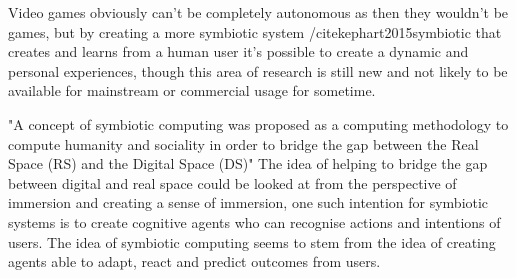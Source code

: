 \documentclass{scrartcl}
\begin{document}
Video games obviously can't be completely autonomous as then they wouldn't be games, but by creating a more symbiotic system /cite{kephart2015symbiotic} that creates and learns from a human user it's possible to create a dynamic and personal experiences, though this area of research is still new and not likely to be available for mainstream or commercial usage for sometime. 

"A concept of symbiotic computing was proposed as a computing methodology to compute humanity and sociality in order to bridge the gap between the Real Space (RS) and the Digital Space (DS)" \cite{sugawara2008design} The idea of helping to bridge the gap between digital and real space could be looked at from the perspective of immersion and creating a sense of immersion, one such intention for symbiotic systems is to create cognitive agents who can recognise actions and intentions of users. The idea of symbiotic computing seems to stem from the idea of creating agents able to adapt, react and predict outcomes from users. 



\end{document}
